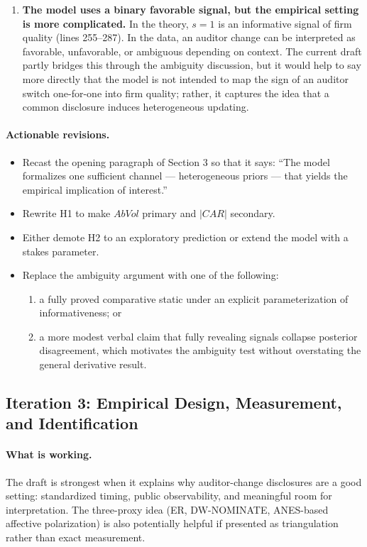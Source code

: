 \documentclass[12pt]{article}
\begin{document}
\begin{enumerate}
    \item \textbf{The model uses a binary favorable signal, but the empirical setting is more complicated.} In the theory, $s=1$ is an informative signal of firm quality (lines 255--287). In the data, an auditor change can be interpreted as favorable, unfavorable, or ambiguous depending on context. The current draft partly bridges this through the ambiguity discussion, but it would help to say more directly that the model is not intended to map the sign of an auditor switch one-for-one into firm quality; rather, it captures the idea that a common disclosure induces heterogeneous updating.
\end{enumerate}

\paragraph{Actionable revisions.}
\begin{itemize}
    \item Recast the opening paragraph of Section 3 so that it says: ``The model formalizes one sufficient channel --- heterogeneous priors --- that yields the empirical implication of interest.''
    \item Rewrite H1 to make $AbVol$ primary and $|CAR|$ secondary.
    \item Either demote H2 to an exploratory prediction or extend the model with a stakes parameter.
    \item Replace the ambiguity argument with one of the following:
    \begin{enumerate}[label=(\alph*)]
        \item a fully proved comparative static under an explicit parameterization of informativeness; or
        \item a more modest verbal claim that fully revealing signals collapse posterior disagreement, which motivates the ambiguity test without overstating the general derivative result.
    \end{enumerate}
\end{itemize}

\subsection*{Iteration 3: Empirical Design, Measurement, and Identification}

\paragraph{What is working.}
The draft is strongest when it explains why auditor-change disclosures are a good setting: standardized timing, public observability, and meaningful room for interpretation. The three-proxy idea (ER, DW-NOMINATE, ANES-based affective polarization) is also potentially helpful if presented as triangulation rather than exact measurement.
\end{document}

